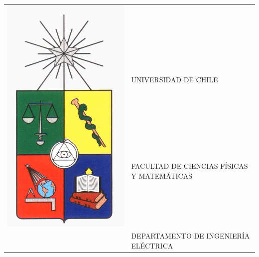 \documentclass[11pt,oneside,letterpaper,leqno]{report}
\newcommand{\dpto}{DEPARTAMENTO DE INGENIERÍA ELÉCTRICA}
\begin{document}
\makeatletter
\def\@roman#1{\romannumeral #1}
\makeatother

\setcounter{page}{1}
\thispagestyle{empty}
\begin{center}

\begin{tabular}{rl}
\multirow{5}{*}{\includegraphics[scale=0.1]{Figuras/escudoU.png}} &\\

& \\
& \\
& UNIVERSIDAD DE CHILE\\
& FACULTAD DE CIENCIAS FÍSICAS Y MATEMÁTICAS\\
& \dpto \\
\end{tabular}


\end{center}
\end{document}
